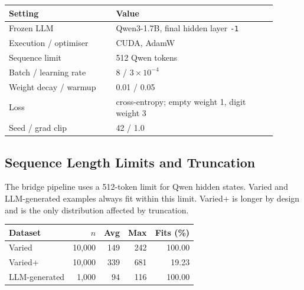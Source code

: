 \documentclass[11pt]{article}
\begin{document}
\begin{center}
\begin{minipage}{0.98\linewidth}
\footnotesize
\setlength{\tabcolsep}{3pt}
\label{tab:app_bridge_common_hparams}
\begin{tabular}{@{}L{0.36\linewidth}L{0.54\linewidth}@{}}
\toprule
Setting & Value \\
\midrule
Frozen LLM & Qwen3-1.7B, final hidden layer \texttt{-1} \\
Execution / optimiser & CUDA, AdamW \\
Sequence limit & 512 Qwen tokens \\
Batch / learning rate & 8 / $3{\times}10^{-4}$ \\
Weight decay / warmup & 0.01 / 0.05 \\
Loss & cross-entropy; empty weight 1, digit weight 3 \\
Seed / grad clip & 42 / 1.0 \\
\bottomrule
\end{tabular}
\end{minipage}
\end{center}

\subsection{Sequence Length Limits and Truncation}
\label{app:sequence_length}

The bridge pipeline uses a 512-token limit for Qwen hidden states.
Varied and LLM-generated examples always fit within this limit.
Varied+ is longer by design and is the only distribution affected by truncation.

\begin{center}
\begin{minipage}{0.98\linewidth}
\scriptsize
\setlength{\tabcolsep}{2pt}
\label{tab:app_sequence_lengths}
\begin{tabular}{@{}lrrrr@{}}
\toprule
Dataset & $n$ & Avg & Max & Fits (\%) \\
\midrule
Varied & 10,000 & 149 & 242 & 100.00 \\
Varied+ & 10,000 & 339 & 681 & 19.23 \\
LLM-generated & 1,000 & 94 & 116 & 100.00 \\
\bottomrule
\end{tabular}
\end{minipage}
\end{center}
\end{document}
